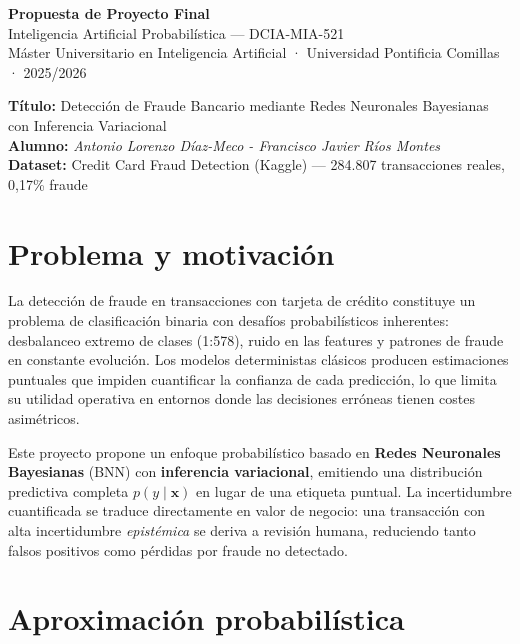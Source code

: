 \documentclass[11pt, a4paper]{article}
\begin{document}
\begin{center}
    {\Large \textbf{Propuesta de Proyecto Final}}\\[4pt]
    {\normalsize Inteligencia Artificial Probabilística — DCIA-MIA-521}\\[2pt]
    {\small Máster Universitario en Inteligencia Artificial · Universidad Pontificia Comillas · 2025/2026}
\end{center}

\vspace{0.3cm}
\begin{mdframed}[backgroundcolor=lightgray, linecolor=accentblue, linewidth=1pt, innertopmargin=6pt, innerbottommargin=6pt]
    \textbf{Título:} Detección de Fraude Bancario mediante Redes Neuronales Bayesianas con Inferencia Variacional\\[3pt]
    \textbf{Alumno:} \textit{Antonio Lorenzo Díaz-Meco - Francisco Javier Ríos Montes}\\[3pt]
    \textbf{Dataset:} Credit Card Fraud Detection (Kaggle) — 284.807 transacciones reales, 0,17\% fraude
\end{mdframed}

\section{Problema y motivación}

La detección de fraude en transacciones con tarjeta de crédito constituye un problema de clasificación binaria con desafíos probabilísticos inherentes: desbalanceo extremo de clases (1:578), ruido en las features y patrones de fraude en constante evolución. Los modelos deterministas clásicos producen estimaciones puntuales que impiden cuantificar la confianza de cada predicción, lo que limita su utilidad operativa en entornos donde las decisiones erróneas tienen costes asimétricos.

Este proyecto propone un enfoque probabilístico basado en \textbf{Redes Neuronales Bayesianas} (BNN) con \textbf{inferencia variacional}, emitiendo una distribución predictiva completa $p(y \mid \mathbf{x})$ en lugar de una etiqueta puntual. La incertidumbre cuantificada se traduce directamente en valor de negocio: una transacción con alta incertidumbre \textit{epistémica} se deriva a revisión humana, reduciendo tanto falsos positivos como pérdidas por fraude no detectado.

\section{Aproximación probabilística}
\end{document}

